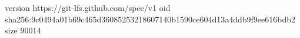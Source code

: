 version https://git-lfs.github.com/spec/v1
oid sha256:9c0494a01b69c465d36085253218607140b1590ce604d13a4ddb9f9ee616bdb2
size 90014
